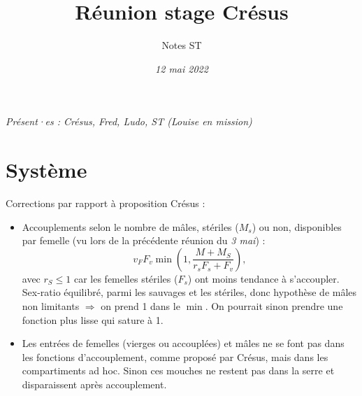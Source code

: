 \documentclass[11pt,twoside]{article}
\begin{document}
\title{\bf Réunion stage Crésus}
\author{Notes ST}
\date{\emph{12 mai 2022}}
\maketitle

\emph{Présent·es : Crésus, Fred, Ludo, ST (Louise en mission)}

\section{Système}

Corrections par rapport à proposition Crésus :

\begin{itemize}
\item Accouplements selon le nombre de mâles, stériles ($M_s$) ou non, disponibles par femelle (vu lors de la précédente réunion du \emph{3 mai}) :
  \begin{equation*}
    v_F F_v \min\left(1,\frac{M+M_S}{r_s F_s+F_v}\right),
  \end{equation*}
  avec $r_S\leqslant 1$ car les femelles stériles ($F_s$) ont moins tendance à s'accoupler. \\
  Sex-ratio équilibré, parmi les sauvages et les stériles, donc hypothèse de mâles non limitants $\Rightarrow$ on prend 1 dans le $\min$. On pourrait sinon prendre une fonction plus lisse qui sature à 1.
  
\item Les entrées de femelles (vierges ou accouplées) et mâles ne se font pas dans les fonctions d'accouplement, comme proposé par Crésus, mais dans les compartiments ad hoc. Sinon ces mouches ne restent pas dans la serre et disparaissent après accouplement.
\end{itemize}
\end{document}
